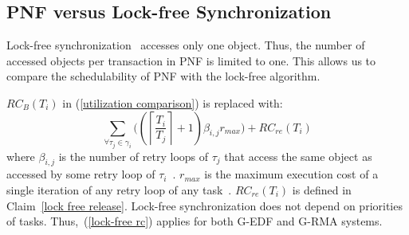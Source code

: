 \documentclass[a4paper,english]{article}
\begin{document}
\subsection{PNF versus Lock-free Synchronization\label{pnf vs lock free sec}}

Lock-free synchronization~\cite{key-5,stmconcurrencycontrol:emsoft11} accesses only one object. Thus, the number of accessed objects per transaction in PNF is limited to one. This allows us to compare the schedulability of PNF with the lock-free algorithm. 

$RC_{B}(T_{i})$ in (\ref{utilization comparison}) is replaced with:
%
\begin{equation}
\sum_{\forall\tau_{j}\in\gamma_{i}}\Bigg(\left(\left\lceil \frac{T_{i}}{T_{j}}\right\rceil +1\right)\beta_{i,j}r_{max}\Bigg)+RC_{re}(T_{i})
\label{lock-free rc}
\end{equation}
%
where $\beta_{i,j}$ is the number of retry loops of $\tau_{j}$ that access the same object as accessed by some retry loop of $\tau_{i}$~\cite{key-5}. $r_{max}$ is the maximum execution cost of a single iteration of any retry loop of any task~\cite{key-5}. $RC_{re}(T_i)$ is defined in Claim~\ref{lock free release}. Lock-free synchronization does not depend on priorities  of tasks. Thus,~(\ref{lock-free rc}) applies for both G-EDF and G-RMA systems.
\end{document}
